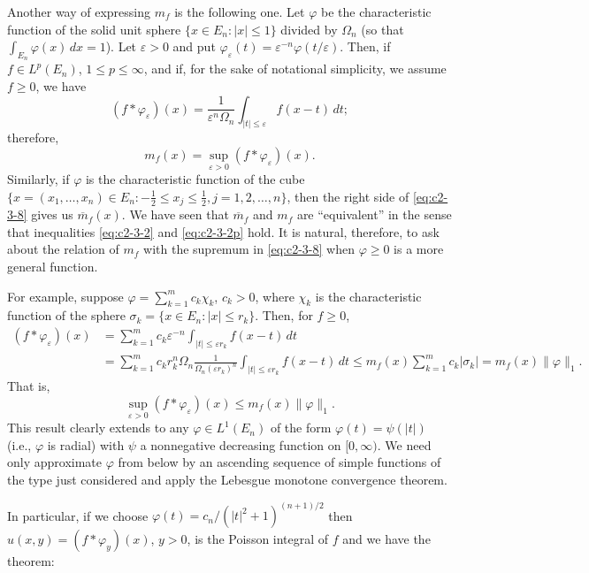 Another way of expressing $m_f$ is the following one. Let $\varphi$ be the characteristic function of the solid unit sphere $\{x \in E_n : |x| \leq 1\}$ divided by $\Omega_n$ (so that $\int_{E_n} \varphi(x)\,dx = 1$). Let $\varepsilon > 0$ and put $\varphi_\varepsilon(t) = \varepsilon^{-n}\varphi(t/\varepsilon)$. Then, if $f \in L^p(E_n)$, $1 \leq p \leq \infty$, and if, for the sake of notational simplicity, we assume $f \geq 0$, we have
\[
(f * \varphi_\varepsilon)(x) = \frac{1}{\varepsilon^n \Omega_n} \int_{|t| \leq \varepsilon} f(x - t)\,dt;
\]
therefore,
\begin{equation}\label{eq:c2-3-8}
m_f(x) = \sup_{\varepsilon > 0} (f * \varphi_\varepsilon)(x).
\end{equation}
Similarly, if $\varphi$ is the characteristic function of the cube $\{x = (x_1, \dots, x_n) \in E_n : -\frac{1}{2} \leq x_j \leq \frac{1}{2}, j = 1, 2, \dots, n\}$, then the right side of \eqref{eq:c2-3-8} gives us $\overline{m}_f(x)$. We have seen that $\overline{m}_f$ and $m_f$ are ``equivalent'' in the sense that inequalities \eqref{eq:c2-3-2} and \eqref{eq:c2-3-2p} hold. It is natural, therefore, to ask about the relation of $m_f$ with the supremum in \eqref{eq:c2-3-8} when $\varphi \geq 0$ is a more general function.

For example, suppose $\varphi = \sum_{k=1}^m c_k \chi_k$, $c_k > 0$, where $\chi_k$ is the characteristic function of the sphere $\sigma_k = \{x \in E_n : |x| \leq r_k\}$. Then, for $f \geq 0$,
\[
\begin{aligned}
(f * \varphi_\varepsilon)(x) &= \sum_{k=1}^m c_k \varepsilon^{-n} \int_{|t| \leq \varepsilon r_k} f(x - t)\,dt \\
&= \sum_{k=1}^m c_k r_k^n \Omega_n \frac{1}{\Omega_n (\varepsilon r_k)^n} \int_{|t| \leq \varepsilon r_k} f(x - t)\,dt
\leq m_f(x) \sum_{k=1}^m c_k |\sigma_k| = m_f(x) \|\varphi\|_1.
\end{aligned}
\]
That is,
\begin{equation}\label{eq:c2-3-9}
\sup_{\varepsilon > 0} (f * \varphi_\varepsilon)(x) \leq m_f(x) \|\varphi\|_1.
\end{equation}
This result clearly extends to any $\varphi \in L^1(E_n)$ of the form $\varphi(t) = \psi(|t|)$ (i.e., $\varphi$ is radial) with $\psi$ a nonnegative decreasing function on $[0, \infty)$. We need only approximate $\varphi$ from below by an ascending sequence of simple functions of the type just considered and apply the Lebesgue monotone convergence theorem.

In particular, if we choose $\varphi(t) = c_n/(|t|^2 + 1)^{(n+1)/2}$ then $u(x, y) = (f * \varphi_y)(x)$, $y > 0$, is the Poisson integral of $f$ and we have the theorem:

